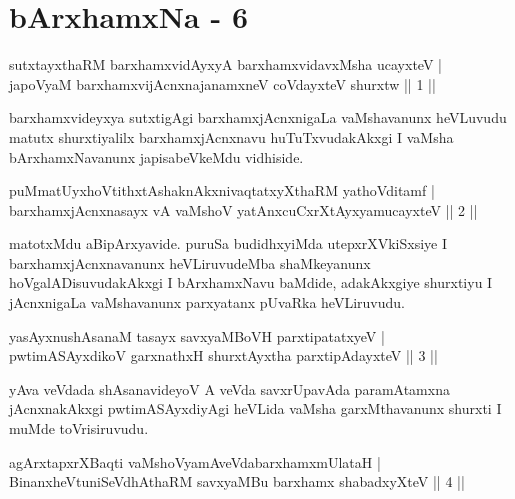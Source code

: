 \chapter{bArxhamxNa - 6}

\begin{shl}
sutxtayxthaRM barxhamxvidAyxyA barxhamxvidavxMsha ucayxteV |\\
japoV\s yaM barxhamxvijAcnxnajanamxneV coVdayxteV shurxtw \hfill || 1 ||
\end{shl}

\begin{artha}
barxhamxvideyxya sutxtigAgi barxhamxjAcnxnigaLa vaMshavanunx heVLuvudu matutx shurxtiyalilx barxhamxjAcnxnavu huTuTxvudakAkxgi I vaMsha bArxhamxNavanunx japisabeVkeMdu vidhiside.
\end{artha}

\begin{shl}
puMmatUyxhoVtithxtAshaknAkxnivaqtatxyXthaRM yathoVditamf |\\
barxhamxjAcnxnasayx vA vaMshoV yatAnxcuCxrXtAyx\s yamucayxteV \hfill || 2 ||
\end{shl}

\begin{artha}
matotxMdu aBipArxyavide. puruSa budidhxyiMda utepxrXVkiSxsiye I barxhamxjAcnxnavanunx heVLiruvudeMba shaMkeyanunx hoVgalADisuvudakAkxgi I bArxhamxNavu baMdide, adakAkxgiye shurxtiyu I jAcnxnigaLa vaMshavanunx parxyatanx pUvaRka heVLiruvudu.
\end{artha}


\begin{shl}
yasAyxnushAsanaM tasayx savxyaMBoVH parxtipatatxyeV |\\
pwtimASAyxdikoV garxnathxH shurxtAyx\s tha parxtipAdayxteV \hfill || 3 ||
\end{shl}

\begin{artha}
yAva veVdada shAsanavideyoV A veVda savxrUpavAda paramAtamxna jAcnxnakAkxgi pwtimASAyxdiyAgi heVLida vaMsha garxMthavanunx shurxti I muMde toVrisiruvudu.
\end{artha}

\begin{shl}
agArxtapxrXBaqti vaMshoV\s yamAveVdabarxhamxmUlataH |\\
BinanxheVtuniSeVdhAthaRM savxyaMBu barxhamx shabadxyXteV \hfill || 4 ||
\end{shl}

